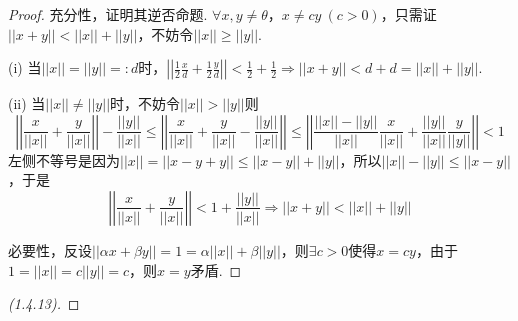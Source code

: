 \documentclass[12pt, a4paper, oneside]{ctexart}
\let\leq=\leqslant %
\let\geq=\geqslant %
\def\add{\vspace{1ex}}      %
\begin{document}
\begin{proof}
    充分性，证明其逆否命题. $\forall x, y\neq \theta$，$x\neq cy\ (c > 0)$，只需证$||x+y|| < ||x||+||y||$，不妨令$||x||\geq ||y||$.

    (i) 当$||x|| = ||y||=:d$时，$\left|\left|\frac{1}{2}\frac{x}{d}+\frac{1}{2}\frac{y}{d}\right|\right| < \frac{1}{2}+\frac{1}{2}\Rightarrow ||x+y|| < d+d = ||x||+||y||$.\add

    (ii) 当$||x||\neq ||y||$时，不妨令$||x|| > ||y||$则
    \begin{equation*}
        \left|\left|\frac{x}{||x||}+\frac{y}{||x||}\right|\right|-\frac{||y||}{||x||}\leq \left|\left|\frac{x}{||x||}+\frac{y}{||x||}-\frac{||y||}{||x||}\right|\right|\leq \left|\left|\frac{||x||-||y||}{||x||}\frac{x}{||x||}+\frac{||y||}{||x||}\frac{y}{||y||}\right|\right|<1
    \end{equation*}
    左侧不等号是因为$||x||= ||x-y+y||\leq ||x-y||+||y||$，所以$||x||-||y||\leq ||x-y||$，于是
    \begin{equation*}
        \left|\left|\frac{x}{||x||}+\frac{y}{||x||}\right|\right| < 1+\frac{||y||}{||x||}\Rightarrow ||x+y|| < ||x||+||y||
    \end{equation*}

    必要性，反设$||\alpha x+\beta y|| = 1 = \alpha||x||+\beta||y||$，则$\exists c > 0$使得$x=cy$，由于$1=||x||=c||y|| = c$，则$x=y$矛盾.
\end{proof}
\begin{proof}[(1.4.13)]
    
\end{proof}

\end{document}
